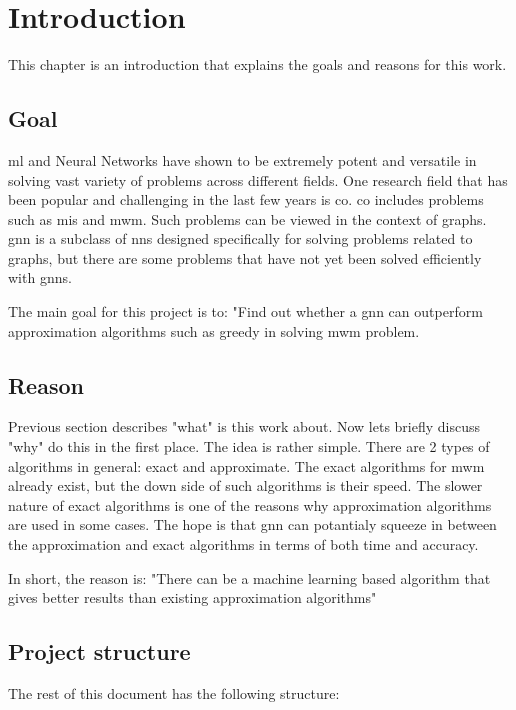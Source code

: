 \chapter{Introduction}

This chapter is an introduction that explains the goals and reasons for this work.

\section{Goal}

\gls{ml} and Neural Networks have shown to be extremely potent and versatile in solving vast variety of problems across different fields. One research field that has been popular and challenging in the last few years is \gls{co}. \gls{co} includes problems such as \gls{mis} and \gls{mwm}. Such problems can be viewed in the context of graphs. \gls{gnn} is a subclass of \gls{nn}s designed specifically for solving problems related to graphs, but there are some problems that have not yet been solved efficiently with \gls{gnn}s. 

The main goal for this project is to: "Find out whether a \gls{gnn} can outperform approximation algorithms such as greedy in solving \gls{mwm} problem. 

\section{Reason}

Previous section describes "what" is this work about. Now lets briefly discuss "why" do this in the first place. The idea is rather simple. There are 2 types of algorithms in general: exact and approximate. The exact algorithms for \gls{mwm} already exist, but the down side of such algorithms is their speed. The slower nature of exact algorithms is one of the reasons why approximation algorithms are used in some cases. The hope is that  \gls{gnn} can potantialy squeeze in between the approximation and exact algorithms in terms of both time and accuracy.

In short, the reason is: "There can be a machine learning based algorithm that gives better results than existing approximation algorithms"

\section{Project structure}

The rest of this document has the following structure:

